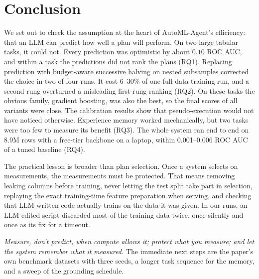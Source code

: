 \section{Conclusion}
\label{sec:conclusion}

We set out to check the assumption at the heart of AutoML-Agent's efficiency: that an LLM can predict how well a plan will perform. On two large tabular tasks, it could not. Every prediction was optimistic by about $0.10$ ROC AUC, and within a task the predictions did not rank the plans (RQ1). Replacing prediction with budget-aware successive halving on nested subsamples corrected the choice in two of four runs. It cost 6--30\% of one full-data training run, and a second rung overturned a misleading first-rung ranking (RQ2). On these tasks the obvious family, gradient boosting, was also the best, so the final scores of all variants were close. The calibration results show that pseudo-execution would not have noticed otherwise. Experience memory worked mechanically, but two tasks were too few to measure its benefit (RQ3). The whole system ran end to end on 8.9M rows with a free-tier backbone on a laptop, within 0.001--0.006 ROC AUC of a tuned baseline (RQ4).

The practical lesson is broader than plan selection. Once a system selects on measurements, the measurements must be protected. That means removing leaking columns before training, never letting the test split take part in selection, replaying the exact training-time feature preparation when serving, and checking that LLM-written code actually trains on the data it was given. In our runs, an LLM-edited script discarded most of the training data twice, once silently and once as its fix for a timeout.

\emph{Measure, don't predict, when compute allows it; protect what you measure; and let the system remember what it measured.} The immediate next steps are the paper's own benchmark datasets with three seeds, a longer task sequence for the memory, and a sweep of the grounding schedule.
